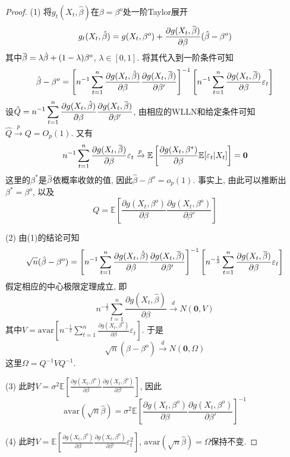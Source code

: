 \documentclass[cn,12pt,math=mtpro2,citestyle=gb7714-2015,bibstyle=gb7714-2015,twocol,mode=simple]{elegantbook}
\newcommand{\overbar}[1]{\mkern 1.5mu\overline{\mkern-1.5mu#1\mkern-1.5mu}\mkern 1.5mu}
\newcommand{\E}{\mathbb{E}}
\newcommand{\hbeta}{\hat{\beta}}
\begin{document}
  \begin{proof}
    (1) 将$g_t(X_t,\hat{\beta})$在$\beta=\beta^o$处一阶Taylor展开
    $$g_t(X_t,\hbeta)=g(X_t,\beta^o)+\frac{\partial g(X_t,\overbar{\beta})}{\partial\beta}(\hat{\beta}-\beta^o)$$
    其中$\overbar{\beta}=\lambda\hbeta+(1-\lambda)\beta^o$, $\lambda\in[0,1]$. 将其代入到一阶条件可知
    $$\hat{\beta}-\beta^o=\left[n^{-1}\sum_{t=1}^{n}\frac{\partial g(X_t,\hbeta)}{\partial\beta}\frac{\partial g(X_t,\overbar{\beta})}{\partial\beta'}\right]^{-1} \left[n^{-1}\sum_{t=1}^{n}\frac{\partial g(X_t,\overbar{\beta})}{\partial\beta}\varepsilon_t\right]$$
    设$\displaystyle \hat{Q}=n^{-1}\sum_{t=1}^{n}\frac{\partial g(X_t,\hbeta)}{\partial\beta}\frac{\partial g(X_t,\overbar{\beta})}{\partial\beta'}$, 由相应的WLLN和给定条件可知$\hat{Q}\xrightarrow{p} Q=O_p(1)$. 又有
    $$n^{-1}\sum_{t=1}^{n}\frac{\partial g(X_t,\overbar{\beta})}{\partial\beta}\varepsilon_t\xrightarrow{p} \E\left[\frac{\partial g(X_t,\beta^\ast)}{\partial \beta}\E[\varepsilon_t|X_t]\right]=\mathbf{0}$$
    这里的$\beta^\ast$是$\overbar{\beta}$依概率收敛的值, 因此$\hbeta-\beta^o=o_p(1)$. 事实上, 由此可以推断出$\beta^\ast=\beta^o$, 以及
    $$\displaystyle Q=\E\left[\frac{\partial g(X_t,\beta^o)}{\partial\beta}\frac{\partial g(X_t,\beta^o)}{\partial\beta'}\right]$$

    (2) 由(1)的结论可知
    $$\sqrt{n}(\hat{\beta}-\beta^o)=\left[n^{-1}\sum_{t=1}^{n}\frac{\partial g(X_t,\hbeta)}{\partial\beta}\frac{\partial g(X_t,\overbar{\beta})}{\partial\beta'}\right]^{-1} \left[n^{-\frac{1}{2}}\sum_{t=1}^{n}\frac{\partial g(X_t,\overbar{\beta})}{\partial\beta}\varepsilon_t\right]$$
    假定相应的中心极限定理成立, 即
    $$n^{-\frac{1}{2}}\sum_{t=1}^{n}\frac{\partial g(X_t,\hat{\beta})}{\partial \beta}\xrightarrow{d} N(\mathbf{0},V)$$
    其中$\displaystyle V=\text{avar}\left[n^{-\frac{1}{2}}\sum_{t=1}^{n}\frac{\partial g(X_t,\beta^o)}{\partial\beta}\varepsilon_t\right]$. 于是
    $$\displaystyle\sqrt{n}(\hbeta-\beta^o)\xrightarrow{d}N(\mathbf{0},\Omega)$$
    这里$\Omega=Q^{-1}VQ^{-1}$.

    (3) 此时$\displaystyle V=\sigma^2\E\left[\frac{\partial g(X_t,\beta^o)}{\partial\beta}\frac{\partial g(X_t,\beta^o)}{\partial\beta'}\right]$, 因此
    $$\text{avar}(\sqrt{n}\hat{\beta})=\sigma^2\E\left[\frac{\partial g(X_t,\beta^o)}{\partial\beta}\frac{\partial g(X_t,\beta^o)}{\partial\beta'}\right]^{-1}$$

    (4) 此时$\displaystyle V=\E\left[\frac{\partial g(X_t,\beta^o)}{\partial\beta}\frac{\partial g(X_t,\beta^o)}{\partial\beta'}\varepsilon_t^2\right]$, $\text{avar}(\sqrt{n}\hbeta)=\Omega$保持不变.


\end{proof}
\end{document}
